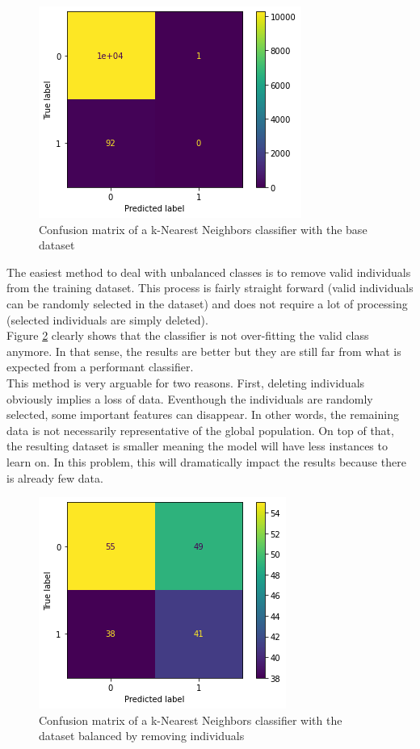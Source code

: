 \begin{figure}
    \center
    \includegraphics[scale=.5]{img/data_preparation_1.png}
    \caption{Confusion matrix of a k-Nearest Neighbors classifier with the base dataset}
    \label{data_preparation_1}
\end{figure}

The easiest method to deal with unbalanced classes is to remove valid individuals from the training dataset. This process is fairly straight forward (valid individuals can be randomly selected in the dataset) and does not require a lot of processing (selected individuals are simply deleted).\\
Figure \ref{data_preparation_2} clearly shows that the classifier is not over-fitting the valid class anymore. In that sense, the results are better but they are still far from what is expected from a performant classifier.\\

This method is very arguable for two reasons. First, deleting individuals obviously implies a loss of data. Eventhough the individuals are randomly selected, some important features can disappear. In other words, the remaining data is not necessarily representative of the global population. On top of that, the resulting dataset is smaller meaning the model will have less instances to learn on. In this problem, this will dramatically impact the results because there is already few data.\\

\begin{figure}
    \center
    \includegraphics[scale=.5]{img/data_preparation_2.png}
    \caption{Confusion matrix of a k-Nearest Neighbors classifier with the dataset balanced by removing individuals}
    \label{data_preparation_2}
\end{figure}

